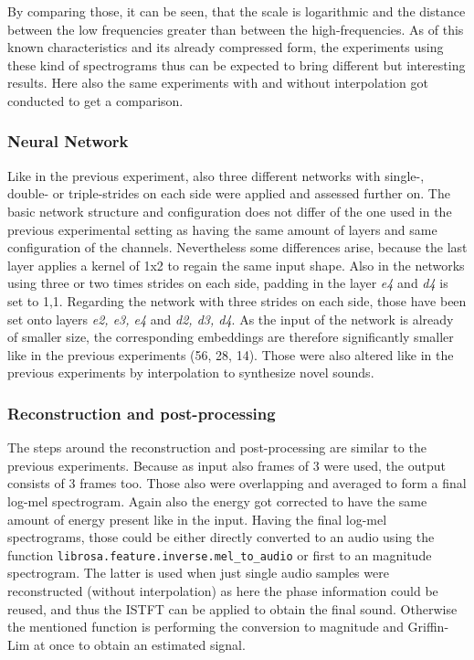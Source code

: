 By comparing those, it can be seen, that the scale is logarithmic and the distance between the low frequencies greater than between the high-frequencies. As of this known characteristics and its already compressed form, the experiments using these kind of spectrograms thus can be expected to bring different but interesting results. Here also the same experiments with and without interpolation got conducted to get a comparison.

\subsubsection{Neural Network}
Like in the previous experiment, also three different networks with single-, double- or triple-strides on each side were applied and assessed further on. The basic network structure and configuration does not differ of the one used in the previous experimental setting as having the same amount of layers and same configuration of the channels. Nevertheless some differences arise, because the last layer applies a kernel of 1x2 to regain the same input shape. Also in the networks using three or two times strides on each side, padding in the layer \textit{e4} and \textit{d4} is set to 1,1. Regarding the network with three strides on each side, those have been set onto layers \textit{e2, e3, e4} and \textit{d2, d3, d4}. As the input of the network is already of smaller size, the corresponding embeddings are therefore significantly smaller like in the previous experiments (56, 28, 14). Those were also altered like in the previous experiments by interpolation to synthesize novel sounds. 

\subsubsection{Reconstruction and post-processing}
The steps around the reconstruction and post-processing are similar to the previous experiments. Because as input also frames of 3 were used, the output consists of 3 frames too. Those also were overlapping and averaged to form a final log-mel spectrogram. Again also the energy got corrected to have the same amount of energy present like in the input. Having the final log-mel spectrograms, those could be either directly converted to an audio using the function \texttt{librosa.feature.inverse.mel\_to\_audio} or first to an magnitude spectrogram. The latter is used when just single audio samples were reconstructed (without interpolation) as here the phase information could be reused, and thus the ISTFT can be applied to obtain the final sound. Otherwise the mentioned function is performing the conversion to magnitude and Griffin-Lim at once to obtain an estimated signal. 


